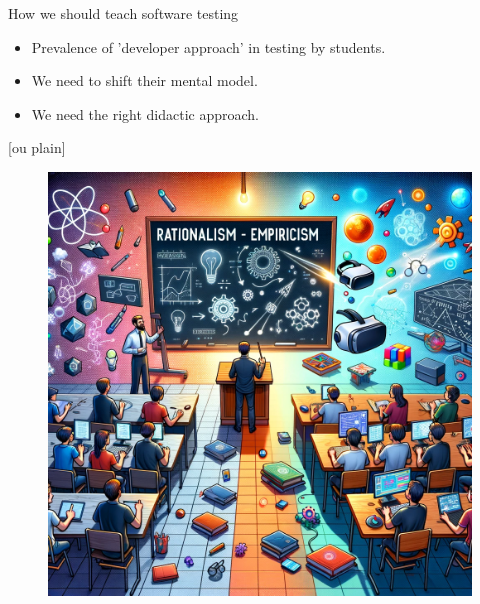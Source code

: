 \documentclass[aspectratio=169]{beamer}
\begin{document}
\begin{frame}{How we should teach software testing}
    \begin{itemize}
        \item Prevalence of 'developer approach' in testing by students.
        \item We need to shift their mental model.
        \item We need the right didactic approach.
    \end{itemize}
\end{frame}

[ou plain]
\begin{frame}
\begin{figure}
    \centering
    \vspace{-1cm}
    \hspace*{-1.2cm}\includegraphics[width=1.2\linewidth]{presentation//images/plaatje.png}
\end{figure}
\end{frame}
\end{document}

